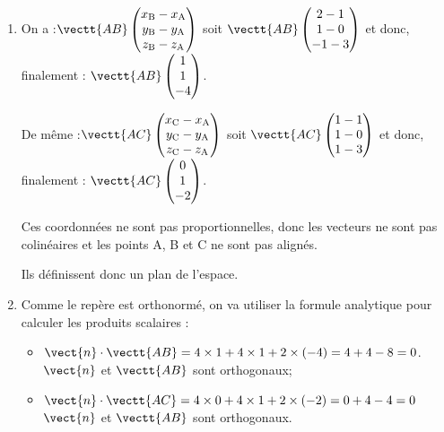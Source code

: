 \begin{enumerate}
	\item  On a :\quad $\vectt{AB}
	\begin{pmatrix}
		x_\mathrm{B} - x_\mathrm{A}\\
		y_\mathrm{B} - y_\mathrm{A}\\
		z_\mathrm{B} - z_\mathrm{A}\\
	\end{pmatrix}$ \quad soit \quad
	$\vectt{AB}
	\begin{pmatrix}
		2- 1\\
		1-0\\
		-1-3
	\end{pmatrix}$
	\quad et donc, finalement :\quad
	$\vectt{AB}
	\begin{pmatrix}
		1\\
		1\\
		-4\\
	\end{pmatrix}$.

	De même :\quad $\vectt{AC}
	\begin{pmatrix}
		x_\mathrm{C} - x_\mathrm{A}\\
		y_\mathrm{C} - y_\mathrm{A}\\
		z_\mathrm{C} - z_\mathrm{A}\\
	\end{pmatrix}$ \quad soit \quad
	$\vectt{AC}
	\begin{pmatrix}
		1 - 1\\
		1- 0\\
		1-3
	\end{pmatrix}$
	\quad et donc, finalement :\quad
	$\vectt{AC}
	\begin{pmatrix}
		0\\
		1\\
		-2\\
	\end{pmatrix}$.

	Ces coordonnées ne sont pas proportionnelles, donc les vecteurs ne sont pas colinéaires et les points A, B et C ne sont pas alignés.

	Ils définissent donc un plan de l'espace.

	\item Comme le repère est orthonormé, on va utiliser la formule analytique pour calculer les produits scalaires :

	\begin{itemize}[label=\textbullet]
		\item $\vect{n} \cdot \vectt{AB} = 4 \times 1 + 4 \times 1 + 2 \times (-4) = 4 + 4 -8 =0$.\quad $\vect{n}$ et $\vectt{AB}$ sont orthogonaux;
		\item $\vect{n} \cdot \vectt{AC} = 4 \times 0 +4 \times 1 + 2 \times (-2) = 0 + 4 -4 =  0$\quad $\vect{n}$ et $\vectt{AB}$ sont orthogonaux.
	\end{itemize}


\end{enumerate}
